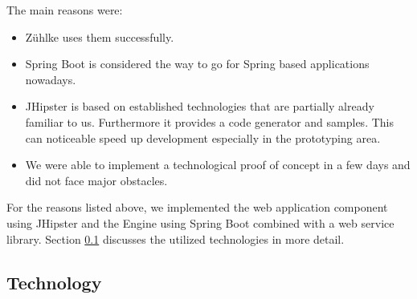 The main reasons were:

\begin{itemize}
\item Zühlke uses them successfully.
\item Spring Boot is considered the way to go for Spring based applications nowadays.
\item JHipster is based on established technologies that are partially already familiar to us. Furthermore it provides a code generator and samples. This can noticeable speed up development especially in the prototyping area.
\item We were able to implement a technological proof of concept in a few days and did not face major obstacles.
\end{itemize}

For the reasons listed above, we implemented the web application component using JHipster and the Engine using Spring Boot combined with a web service library. Section \ref{subsec:technology} discusses the utilized technologies in more detail.

\subsection{Technology}
\label{subsec:technology}


